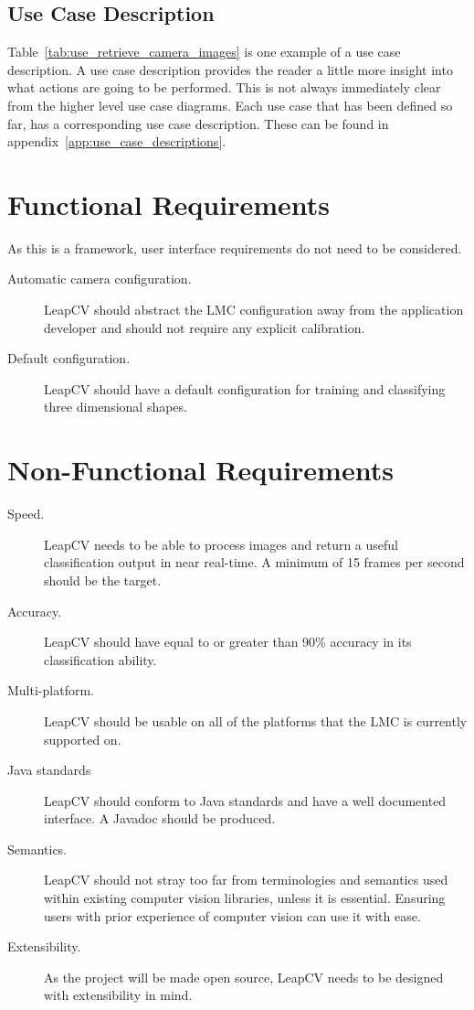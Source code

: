 \documentclass[11pt,oneside]{report}
\begin{document}
			\subsection{Use Case Description}
			Table~\ref{tab:use_retrieve_camera_images} is one example of a use case description.
			A use case description provides the reader a little more insight into what actions are going to be performed.
			This is not always immediately clear from the higher level use case diagrams.
			Each use case that has been defined so far, has a corresponding use case description.
			These can be found in appendix~\ref{app:use_case_descriptions}.
			
		\clearpage
		\section{Functional Requirements}
			
			As this is a framework, user interface requirements do not need to be considered.
			\begin{description}
				\item[Automatic camera configuration.] LeapCV should abstract the LMC configuration away from the application developer and should not require any explicit calibration.
				\item[Default configuration.] LeapCV should have a default configuration for training and classifying three dimensional shapes.
			\end{description}
				
			
		\section{Non-Functional Requirements}
			\begin{description}
				\item[Speed.] LeapCV needs to be able to process images and return a useful classification output in near real-time. 
				A minimum of 15 frames per second should be the target.
				\item[Accuracy.] LeapCV should have equal to or greater than 90\% accuracy in its classification ability.
				\item[Multi-platform.] LeapCV should be usable on all of the platforms that the LMC is currently supported on.
				\item[Java standards] LeapCV should conform to Java standards and have a well documented interface.
				A Javadoc should be produced.
				\item[Semantics.] LeapCV should not stray too far from terminologies and semantics used within existing computer vision libraries, unless it is essential. Ensuring users with prior experience of computer vision can use it with ease.
				\item[Extensibility.] As the project will be made open source, LeapCV needs to be designed with extensibility in mind.
			\end{description}
			
\end{document}
